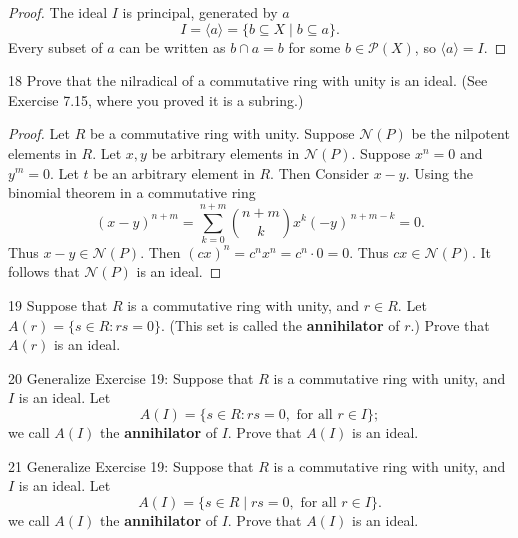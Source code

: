 \begin{proof}
    The ideal $I$ is principal, generated by $a$
    \[
        I = \langle a \rangle = \{ b \subseteq X \mid b \subseteq a \}.
    \]  
    Every subset of $a$ can be written as $b \cap a = b$ for some $b \in \mathcal{P}(X)$, so $\langle a \rangle = I$.
\end{proof}

\begin{problem}{18}
    Prove that the nilradical of a commutative ring with unity is an ideal. (See Exercise 7.15, where you proved it is a subring.)
\end{problem}
\solved

\begin{proof}
    Let $R$ be a commutative ring with unity.
    Suppose $\mathcal{N}(P)$ be the nilpotent elements in $R$.
    Let $x, y$ be arbitrary elements in $\mathcal{N}(P)$.
    Suppose $x^n = 0$ and $y^m = 0$.
    Let $t$ be an arbitrary element in $R$.
    Then
    Consider $x - y$. Using the binomial theorem in a commutative ring
    \[
        (x - y)^{n + m} = \sum_{k=0}^{n+m} \binom{n+m}{k} x^k (-y)^{\,n+m-k} = 0.
    \]
    Thus $x - y \in \mathcal{N}(P)$.
    Then $(cx)^n = c^n x^n = c^n \cdot 0 = 0$.
    Thus $cx \in \mathcal{N}(P)$.
    It follows that $\mathcal{N}(P)$ is an ideal.
\end{proof}

\begin{problem}{19}
    Suppose that $R$ is a commutative ring with unity, and $r \in R$. Let
    $A(r) = \{s \in R : rs = 0\}$. (This set is called the \textbf{annihilator} of $r$.)
    Prove that $A(r)$ is an ideal.
\end{problem}
\unsolved

\begin{problem}{20}
    Generalize Exercise 19: Suppose that $R$ is a commutative ring with unity, and $I$ is
    an ideal. Let
    \[A(I) = \{s \in R : rs = 0, \text{ for all } r \in I\};\]
    we call $A(I)$ the \textbf{annihilator} of $I$. Prove that $A(I)$ is an ideal.
\end{problem}
\unsolved

\begin{problem}{21}
    Generalize Exercise 19: Suppose that $R$ is a commutative ring with unity, and $I$ is an ideal.
    Let 
    \[A(I) = \{s \in R \mid rs = 0, \text{ for all } r \in I\}.\]
    we call $A(I)$ the \textbf{annihilator} of $I$. Prove that $A(I)$ is an ideal.
\end{problem}
\solved

